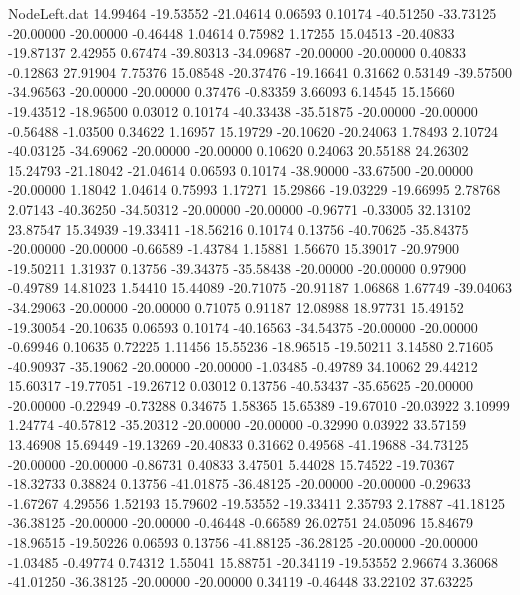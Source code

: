 \begin{filecontents}{NodeLeft.dat}
  14.99464  -19.53552  -21.04614     0.06593    0.10174  -40.51250  -33.73125  -20.00000  -20.00000   -0.46448    1.04614    0.75982    1.17255
  15.04513  -20.40833  -19.87137     2.42955    0.67474  -39.80313  -34.09687  -20.00000  -20.00000    0.40833   -0.12863   27.91904    7.75376
  15.08548  -20.37476  -19.16641     0.31662    0.53149  -39.57500  -34.96563  -20.00000  -20.00000    0.37476   -0.83359    3.66093    6.14545
  15.15660  -19.43512  -18.96500     0.03012    0.10174  -40.33438  -35.51875  -20.00000  -20.00000   -0.56488   -1.03500    0.34622    1.16957
  15.19729  -20.10620  -20.24063     1.78493    2.10724  -40.03125  -34.69062  -20.00000  -20.00000    0.10620    0.24063   20.55188   24.26302
  15.24793  -21.18042  -21.04614     0.06593    0.10174  -38.90000  -33.67500  -20.00000  -20.00000    1.18042    1.04614    0.75993    1.17271
  15.29866  -19.03229  -19.66995     2.78768    2.07143  -40.36250  -34.50312  -20.00000  -20.00000   -0.96771   -0.33005   32.13102   23.87547
  15.34939  -19.33411  -18.56216     0.10174    0.13756  -40.70625  -35.84375  -20.00000  -20.00000   -0.66589   -1.43784    1.15881    1.56670
  15.39017  -20.97900  -19.50211     1.31937    0.13756  -39.34375  -35.58438  -20.00000  -20.00000    0.97900   -0.49789   14.81023    1.54410
  15.44089  -20.71075  -20.91187     1.06868    1.67749  -39.04063  -34.29063  -20.00000  -20.00000    0.71075    0.91187   12.08988   18.97731
  15.49152  -19.30054  -20.10635     0.06593    0.10174  -40.16563  -34.54375  -20.00000  -20.00000   -0.69946    0.10635    0.72225    1.11456
  15.55236  -18.96515  -19.50211     3.14580    2.71605  -40.90937  -35.19062  -20.00000  -20.00000   -1.03485   -0.49789   34.10062   29.44212
  15.60317  -19.77051  -19.26712     0.03012    0.13756  -40.53437  -35.65625  -20.00000  -20.00000   -0.22949   -0.73288    0.34675    1.58365
  15.65389  -19.67010  -20.03922     3.10999    1.24774  -40.57812  -35.20312  -20.00000  -20.00000   -0.32990    0.03922   33.57159   13.46908
  15.69449  -19.13269  -20.40833     0.31662    0.49568  -41.19688  -34.73125  -20.00000  -20.00000   -0.86731    0.40833    3.47501    5.44028
  15.74522  -19.70367  -18.32733     0.38824    0.13756  -41.01875  -36.48125  -20.00000  -20.00000   -0.29633   -1.67267    4.29556    1.52193
  15.79602  -19.53552  -19.33411     2.35793    2.17887  -41.18125  -36.38125  -20.00000  -20.00000   -0.46448   -0.66589   26.02751   24.05096
  15.84679  -18.96515  -19.50226     0.06593    0.13756  -41.88125  -36.28125  -20.00000  -20.00000   -1.03485   -0.49774    0.74312    1.55041
  15.88751  -20.34119  -19.53552     2.96674    3.36068  -41.01250  -36.38125  -20.00000  -20.00000    0.34119   -0.46448   33.22102   37.63225

\end{filecontents}
